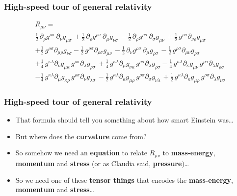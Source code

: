 \documentclass{beamer}
\begin{document}
\begin{frame}
  \frametitle{High-speed tour of general relativity}
\begin{equation*}
\begin{aligned}
&R_{\mu \nu}=\\
&\frac{1}{2}\, {\partial}_{\rho}{{g}^{\rho \sigma}}\,  {\partial}_{\nu}{{g}_{\mu \sigma}}\,  + \frac{1}{2}\, {\partial}_{\rho}{{g}^{\rho \sigma}}\,  {\partial}_{\mu}{{g}_{\nu \sigma}}\,  - \frac{1}{2}\, {\partial}_{\rho}{{g}^{\rho \sigma}}\,  {\partial}_{\sigma}{{g}_{\mu \nu}}\,  + \frac{1}{2}\, {g}^{\rho \sigma} {\partial}_{\nu \rho}{{g}_{\mu \sigma}}\\ 
& + \frac{1}{2}\, {g}^{\rho \sigma} {\partial}_{\mu \rho}{{g}_{\nu \sigma}} - \frac{1}{2}\, {g}^{\rho \sigma} {\partial}_{\rho \sigma}{{g}_{\mu \nu}}\,  - \frac{1}{2}\, {\partial}_{\nu}{{g}^{\rho \sigma}}\,  {\partial}_{\mu}{{g}_{\rho \sigma}}\,  - \frac{1}{2}\, {g}^{\rho \sigma} {\partial}_{\mu \nu}{{g}_{\rho \sigma}}\\
&+ \frac{1}{4}\, {g}^{\kappa \lambda} {\partial}_{\nu}{{g}_{\mu \kappa}}\,  {g}^{\rho \sigma} {\partial}_{\lambda}{{g}_{\rho \sigma}}\,  + \frac{1}{4}\, {g}^{\kappa \lambda} {\partial}_{\mu}{{g}_{\nu \kappa}}\,  {g}^{\rho \sigma} {\partial}_{\lambda}{{g}_{\rho \sigma}} - \frac{1}{4}\, {g}^{\kappa \lambda} {\partial}_{\kappa}{{g}_{\mu \nu}}\,  {g}^{\rho \sigma} {\partial}_{\lambda}{{g}_{\rho \sigma}}\\
&- \frac{1}{4}\, {g}^{\kappa \lambda} {\partial}_{\mu}{{g}_{\kappa \rho}}\,  {g}^{\rho \sigma} {\partial}_{\nu}{{g}_{\lambda \sigma}}\,  - \frac{1}{2}\, {g}^{\kappa \lambda} {\partial}_{\kappa}{{g}_{\mu \rho}}\,  {g}^{\rho \sigma} {\partial}_{\sigma}{{g}_{\nu \lambda}}\,  + \frac{1}{2}\, {g}^{\kappa \lambda} {\partial}_{\kappa}{{g}_{\mu \rho}}\,  {g}^{\rho \sigma} {\partial}_{\lambda}{{g}_{\nu \sigma}} 
\end{aligned}
\end{equation*}
\end{frame}

\begin{frame}
  \frametitle{High-speed tour of general relativity}
  \begin{itemize}
    \item<1-> That formula should tell you something about how smart Einstein was\ldots
    \item<2-> But where does the \textbf{curvature} come from?
    \item<3-> So somehow we need an \textbf{equation} to relate $R_{\mu\nu}$ to \textbf{mass-energy}, \textbf{momentum} and \textbf{stress} (or as Claudia said, \textbf{pressure})\ldots
    \item<4-> So we need one of these \textbf{tensor things} that encodes the \textbf{mass-energy}, \textbf{momentum} and \textbf{stress}\ldots
  \end{itemize}
\end{frame}
\end{document}
